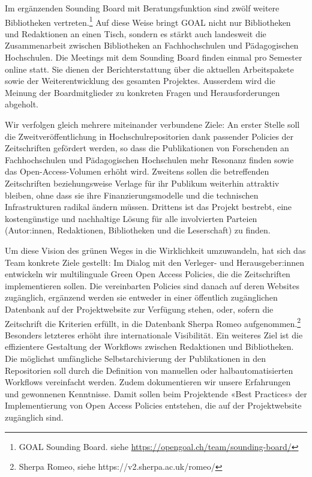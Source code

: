 \documentclass[a4paper,
fontsize=11pt,
oneside,
numbers=noperiodatend,
parskip=half-,
bibliography=totoc,
final
]{scrartcl}
\begin{document}
Im ergänzenden Sounding Board mit Beratungsfunktion sind zwölf weitere
Bibliotheken vertreten.\footnote{GOAL Sounding Board. siehe
  \url{https://opengoal.ch/team/sounding-board/}} Auf diese Weise bringt
GOAL nicht nur Bibliotheken und Redaktionen an einen Tisch, sondern es
stärkt auch landesweit die Zusammenarbeit zwischen Bibliotheken an
Fachhochschulen und Pädagogischen Hochschulen. Die Meetings mit dem
Sounding Board finden einmal pro Semester online statt. Sie dienen der
Berichterstattung über die aktuellen Arbeitspakete sowie der
Weiterentwicklung des gesamten Projektes. Ausserdem wird die Meinung der
Boardmitglieder zu konkreten Fragen und Herausforderungen abgeholt.

Wir verfolgen gleich mehrere miteinander verbundene Ziele: An erster
Stelle soll die Zweitveröffentlichung in Hochschulrepositorien dank
passender Policies der Zeitschriften gefördert werden, so dass die
Publikationen von Forschenden an Fachhochschulen und Pädagogischen
Hochschulen mehr Resonanz finden sowie das Open-Access-Volumen erhöht
wird. Zweitens sollen die betreffenden Zeitschriften beziehungsweise
Verlage für ihr Publikum weiterhin attraktiv bleiben, ohne dass sie ihre
Finanzierungsmodelle und die technischen Infrastrukturen radikal ändern
müssen. Drittens ist das Projekt bestrebt, eine kostengünstige und
nachhaltige Lösung für alle involvierten Parteien (Autor:innen,
Redaktionen, Bibliotheken und die Leserschaft) zu finden.

Um diese Vision des grünen Weges in die Wirklichkeit umzuwandeln, hat
sich das Team konkrete Ziele gestellt: Im Dialog mit den Verleger- und
Herausgeber:innen entwickeln wir multilinguale Green Open Access
Policies, die die Zeitschriften implementieren sollen. Die vereinbarten
Policies sind danach auf deren Websites zugänglich, ergänzend werden sie
entweder in einer öffentlich zugänglichen Datenbank auf der
Projektwebsite zur Verfügung stehen, oder, sofern die Zeitschrift die
Kriterien erfüllt, in die Datenbank Sherpa Romeo aufgenommen.\footnote{Sherpa
  Romeo, siehe https://v2.sherpa.ac.uk/romeo/} Besonders letzteres
erhöht ihre internationale Visibilität. Ein weiteres Ziel ist die
effizientere Gestaltung der Workflows zwischen Redaktionen und
Bibliotheken. Die möglichst umfängliche Selbstarchivierung der
Publikationen in den Repositorien soll durch die Definition von
manuellen oder halbautomatisierten Workflows vereinfacht werden. Zudem
dokumentieren wir unsere Erfahrungen und gewonnenen Kenntnisse. Damit
sollen beim Projektende «Best Practices» der Implementierung von Open
Access Policies entstehen, die auf der Projektwebsite zugänglich sind.
\end{document}
